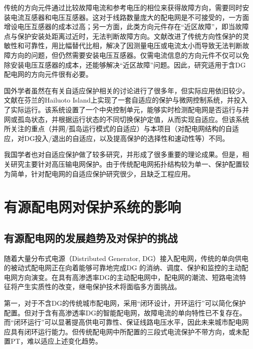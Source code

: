 传统的方向元件通过比较故障电流和参考电压的相位来获得故障方向，需要同时安装电流互感器和电压互感器。这对于线路数量庞大的配电网是不可接受的，一方面增设电压互感器的成本过高；另一方面，此类方向元件存在“近区故障”，即当故障点与保护安装处距离过近时，无法判断故障方向。文献\cite{gao2006design}改进了传统方向性保护的灵敏性和可靠性，用比幅替代比相，解决了因测量电压或电流太小而导致无法判断故障方向的问题，但仍然需要安装电压互感器。仅需电流信息的方向元件不仅可以免除安装电压互感器的成本，还能够解决“近区故障”问题\cite{pradhan2008solution}。因此，研究适用于含DG配电网的方向元件很有必要。

国外学者虽然在有关自适应保护相关的讨论进行了很多年，但实际应用依旧较少。文献\cite{laaksonen2014adaptive}在芬兰的Hailuoto Island上实现了一套自适应的保护与微网控制系统，并投入了实际运行。该系统设置了一个中央控制单元，能够实时检测配电网是否运行与并网或孤岛状态，并根据运行状态的不同切换保护定值，从而实现自适应。但该系统所关注的重点（并网/孤岛运行模式的自适应）与本项目（对配电网结构的自适应，对DG投入/退出的自适应，以及提高保护的选择性和速动性等）不同。

我国学者也对自适应保护做了较多研究，并形成了很多重要的理论成果\cite{yaozhong2007}。但是，相关研究主要针对高压输电网保护。由于传统配电网拓扑结构较为单一、保护配置较为简单，针对配电网的自适应保护研究很少，且缺乏工程应用。


\section{有源配电网对保护系统的影响}

\subsection{有源配电网的发展趋势及对保护的挑战}

随着大量分布式电源（Distributed Generator, DG）接入配电网，传统的单向供电的被动式配电网正在向着能够可靠地完成DG 的消纳、调度、保护和监控的主动配电网方向演变\cite{tianming2013,lipeng2009}。在具有高渗透率DG的主动配电网中，配电网的潮流、短路电流特征将产生实质性的改变\cite{li2009application,zhang2016new,manditereza2016}，继电保护技术将面临多方面挑战。

第一，对于不含DG的传统城市配电网，采用“闭环设计，开环运行”可以简化保护配置。但对于含有高渗透率DG的智能配电网，故障电流的单向特性已不复存在。而“闭环运行”可以显著提高供电可靠性、保证线路电压水平，因此未来城市配电网应具有闭环运行能力。但传统配电网中所配置的三段式电流保护不带方向，或未配置PT，难以适应上述变化趋势。

